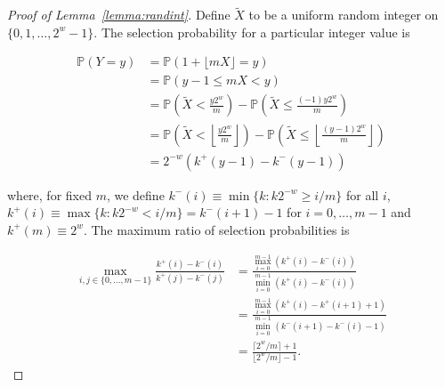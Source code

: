 \documentclass[12pt]{article}
\newcommand{\todo}[1]{{\color{red}{TO DO: \sc #1}}}
\newcommand{\pr}{\mathbb{P}} %
\begin{document}
\begin{proof}[Proof of Lemma~\ref{lemma:randint}]
Define $\tilde{X}$ to be a uniform random integer on $\{0, 1, \dots, 2^w - 1\}$.
The selection probability for a particular integer value is 

\begin{align*}
\pr\left(Y = y\right) &= \pr\left(1 + \lfloor mX \rfloor = y\right) \\
&= \pr\left(y-1 \leq mX < y\right) \\
&= \pr\left(\tilde{X} < \frac{y2^w}{m}\right) - \pr\left(\tilde{X} \leq \frac{(-1)y2^w}{m}\right)\\
&= \pr\left(\tilde{X} < \left\lfloor\frac{y2^w}{m}\right\rfloor\right) - \pr\left(\tilde{X} \leq \left\lfloor\frac{(y-1)2^w}{m}\right\rfloor\right)\\
&= 2^{-w}\left(k^+(y-1)- k^-(y-1)\right)
\end{align*}

\noindent where, for fixed $m$, we define $k^-(i) \equiv \min \{k: k2^{-w} \geq i/m\}$ for all $i$,
$k^+(i) \equiv \max \{k : k2^{-w} < i/m \} = k^-(i+1)-1$ for $i = 0, \dots, m-1$
and $k^+(m) \equiv 2^w$.
The maximum ratio of selection probabilities is 

\begin{align*}
\max_{i, j \in \{0, \ldots, m-1\}} \frac{k^+(i) - k^-(i)}{k^+(j) - k^-(j)}
&= \frac{ \max_{i=0}^{m-1} (k^+(i) - k^-(i))}{\min_{i=0}^{m-1} (k^+(i) - k^-(i))} \\
&= \frac{ \max_{i=0}^{m-1} (k^+(i) - k^+(i+1) + 1)}{\min_{i=0}^{m-1} (k^-(i+1) - k^-(i) - 1)} \\
&= \frac{\lceil 2^w/m \rceil + 1}{\lfloor 2^w/m \rfloor -1}.
\end{align*}
\end{proof}
\todo{is this proof right? seems wrong}
\end{document}
